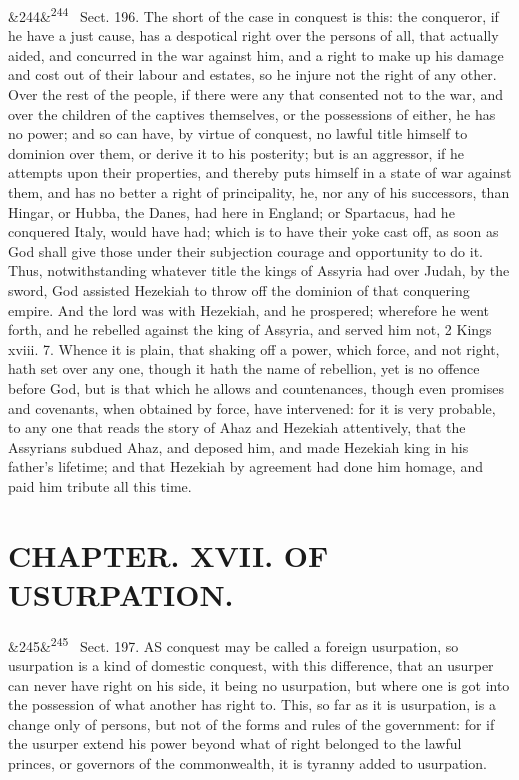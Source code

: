 \documentclass[12pt]{article}
\newcommand{\para}[1][]{\par\noindent\ifx&#1&\else\textsuperscript{\footnotesize #1}~\fi}
\begin{document}
\para[244] Sect. 196. The short of the case in conquest is this: the conqueror, if he have a just cause, has a despotical right over the persons of all, that actually aided, and concurred in the war against him, and a right to make up his damage and cost out of their labour and estates, so he injure not the right of any other. Over the rest of the people, if there were any that consented not to the war, and over the children of the captives themselves, or the possessions of either, he has no power; and so can have, by virtue of conquest, no lawful title himself to dominion over them, or derive it to his posterity; but is an aggressor, if he attempts upon their properties, and thereby puts himself in a state of war against them, and has no better a right of principality, he, nor any of his successors, than Hingar, or Hubba, the Danes, had here in England; or Spartacus, had he conquered Italy, would have had; which is to have their yoke cast off, as soon as God shall give those under their subjection courage and opportunity to do it. Thus, notwithstanding whatever title the kings of Assyria had over Judah, by the sword, God assisted Hezekiah to throw off the dominion of that conquering empire. And the lord was with Hezekiah, and he prospered; wherefore he went forth, and he rebelled against the king of Assyria, and served him not, 2 Kings xviii. 7. Whence it is plain, that shaking off a power, which force, and not right, hath set over any one, though it hath the name of rebellion, yet is no offence before God, but is that which he allows and countenances, though even promises and covenants, when obtained by force, have intervened: for it is very probable, to any one that reads the story of Ahaz and Hezekiah attentively, that the Assyrians subdued Ahaz, and deposed him, and made Hezekiah king in his father's lifetime; and that Hezekiah by agreement had done him homage, and paid him tribute all this time.

\section*{CHAPTER. XVII. OF USURPATION.}

\para[245] Sect. 197. AS conquest may be called a foreign usurpation, so usurpation is a kind of domestic conquest, with this difference, that an usurper can never have right on his side, it being no usurpation, but where one is got into the possession of what another has right to. This, so far as it is usurpation, is a change only of persons, but not of the forms and rules of the government: for if the usurper extend his power beyond what of right belonged to the lawful princes, or governors of the commonwealth, it is tyranny added to usurpation.
\end{document}
